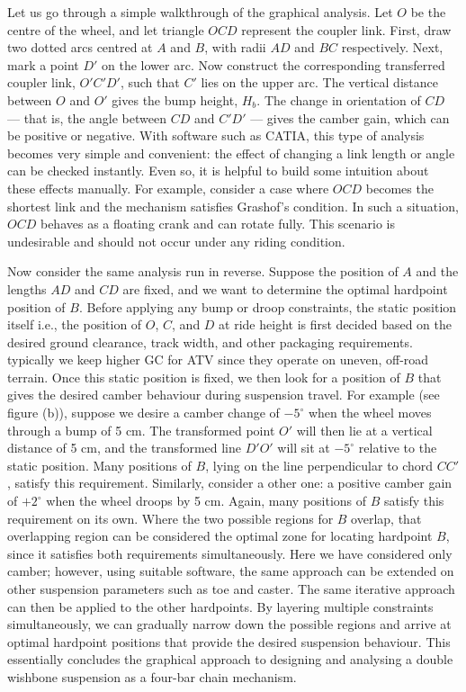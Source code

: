 \documentclass[12pt,a4paper]{article}
\begin{document}
Let us go through a simple walkthrough of the graphical analysis. Let $O$ be the centre of the wheel, and let triangle $OCD$ represent the coupler link. First, draw two dotted arcs centred at $A$ and $B$, with radii $AD$ and $BC$ respectively. Next, mark a point $D'$ on the lower arc. Now construct the corresponding transferred coupler link, $O'C'D'$, such that $C'$ lies on the upper arc. The vertical distance between $O$ and $O'$ gives the bump height, $H_b$. The change in orientation of $CD$ — that is, the angle between $CD$ and $C'D'$ — gives the camber gain, which can be positive or negative.
With software such as CATIA, this type of analysis becomes very simple and convenient: the effect of changing a link length or angle can be checked instantly. Even so, it is helpful to build some intuition about these effects manually. For example, consider a case where $OCD$ becomes the shortest link and the mechanism satisfies Grashof's condition. In such a situation, $OCD$ behaves as a floating crank and can rotate fully. This scenario is undesirable and should not occur under any riding condition.

Now consider the same analysis run in reverse. Suppose the position of $A$ and the lengths $AD$ and $CD$ are fixed, and we want to determine the optimal hardpoint position of $B$. Before applying any bump or droop constraints, the static position itself i.e., the position of $O$, $C$, and $D$ at ride height is first decided based on the desired ground clearance, track width, and other packaging requirements. typically we keep higher GC for ATV since they operate on
uneven, off-road terrain. Once this static position is fixed, we then look for a position of $B$ that gives the desired camber behaviour during suspension travel.
For example (see figure (b)), suppose we desire a camber change of $-5^\circ$ when the wheel moves through a bump of 5 cm. The transformed point $O'$ will then lie at a vertical distance of 5 cm, and the transformed line $D'O'$ will sit at $-5^\circ$ relative to the static position. Many positions of $B$, lying on the line perpendicular to chord $CC'$, satisfy this requirement. Similarly, consider a other one: a positive camber gain of $+2^\circ$ when the wheel droops by 5 cm. Again, many positions of $B$ satisfy this requirement on its own. Where the two possible regions for $B$ overlap, that overlapping region can be considered the optimal zone for locating hardpoint $B$, since it satisfies both requirements simultaneously.
Here we have considered only camber; however, using suitable software, the same approach can be extended on other suspension parameters such as toe and caster. The same iterative approach can then be applied to the other hardpoints. By layering multiple constraints simultaneously, we can gradually narrow down the possible regions and arrive at optimal hardpoint positions that provide the desired suspension behaviour. This essentially concludes the graphical approach to designing and analysing a double wishbone suspension as a four-bar chain mechanism.
\end{document}
